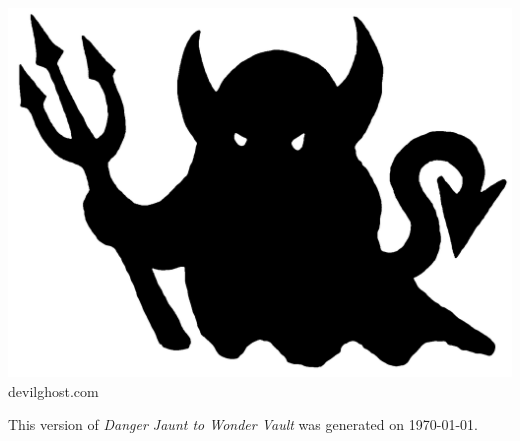 \documentclass[fontsize=9pt,twoside]{scrreprt}
\newcommand{\blankpage}{
    \newpage
    \thispagestyle{empty}
    \mbox{}
    \newpage
}
\begin{document}
\begin{titlepage}
\begin{center}
    \vspace{4ex}
	\includegraphics[scale=.125]{img/devilghost.png} \\
	\footnotesize devilghost.com
    \end{center}
\end{titlepage}
\clearpage

\blankpage

\renewcommand\thepage{}
\thispagestyle{empty}
{\small \tableofcontents}
\clearpage
\renewcommand\thepage{\arabic{page}}



\vfill
\centering
\noindent \footnotesize This version of \textit{Danger Jaunt to Wonder Vault} was generated on \today.
\end{document}
